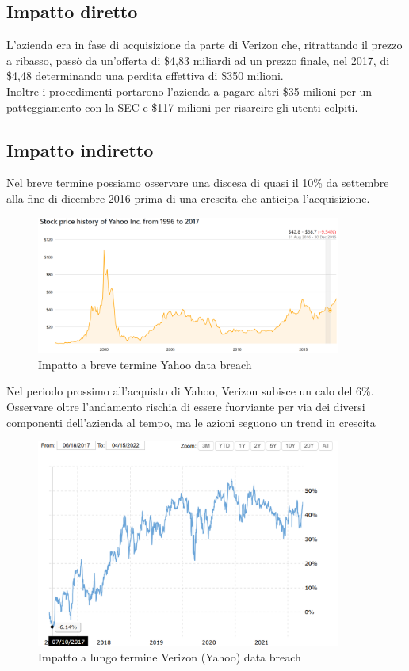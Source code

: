 \documentclass[12pt,a4paper,openright,twoside]{report}
\begin{document}
\subsection{Impatto diretto}
L'azienda era in fase di acquisizione da parte di Verizon che, ritrattando il prezzo a ribasso, pass\`o da un'offerta di \$4,83 miliardi ad un prezzo finale, nel 2017, di \$4,48 determinando una perdita effettiva di \$350 milioni\cite{yahoo_book}.\\
Inoltre i procedimenti portarono l'azienda a pagare altri \$35 milioni per un patteggiamento con la SEC e \$117 milioni per risarcire gli utenti colpiti.\\
\subsection{Impatto indiretto}
Nel breve termine possiamo osservare una discesa di quasi il 10\% da settembre alla fine di dicembre 2016 prima di una crescita che anticipa l'acquisizione.\\
\begin{figure}[H] 
\begin{center} 
\includegraphics[width=10cm]{figures/yahoo_short.png} 
\caption[Grafico Yahoo short]{Impatto a breve termine Yahoo data breach}\label{fig:yahoo1}
\end{center}
\end{figure}

Nel periodo prossimo all'acquisto di Yahoo, Verizon subisce un calo del 6\%. Osservare oltre l'andamento rischia di essere fuorviante per via dei diversi componenti dell'azienda al tempo, ma le azioni seguono un trend in crescita\\
\begin{figure}[H] 
\begin{center} 
\includegraphics[width=10cm]{figures/yahoo-verizon-long.png} 
\caption[Grafico Verizon (Yahoo) long]{Impatto a lungo termine Verizon (Yahoo) data breach}\label{fig:yahoo2}
\end{center}
\end{figure}
\end{document}
